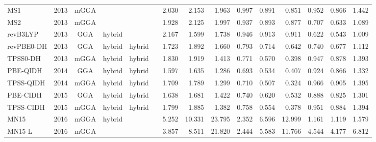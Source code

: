 \begin{landscape}
\begin{longtable}{ll:cccc:rrr:rrr:rrr}
    MS1              & 2013 & mGGA &          &             &           & 2.030             & 2.153             & 1.963  & 0.997              & 0.891             & 0.851  & 0.952   & 0.866 & 1.442 \\
    MS2              & 2013 & mGGA &          &             &           & 1.928             & 2.125             & 1.997  & 0.937              & 0.893             & 0.877  & 0.707   & 0.633 & 1.089 \\
    revB3LYP         & 2013 & GGA  & hybrid   &             &           & 2.167             & 1.599             & 1.738  & 0.946              & 0.913             & 0.911  & 0.622   & 0.543 & 1.009 \\
    revPBE0-DH       & 2013 & GGA  & hybrid   & hybrid      &           & 1.723             & 1.892             & 1.660  & 0.793              & 0.714             & 0.642  & 0.740   & 0.677 & 1.112 \\
    TPSS0-DH         & 2013 & mGGA & hybrid   & hybrid      &           & 1.830             & 1.919             & 1.413  & 0.771              & 0.570             & 0.398  & 0.947   & 0.878 & 1.393 \\
    PBE-QIDH         & 2014 & GGA  & hybrid   & hybrid      &           & 1.597             & 1.635             & 1.286  & 0.693              & 0.534             & 0.407  & 0.924   & 0.866 & 1.332 \\
    TPSS-QIDH        & 2014 & mGGA & hybrid   & hybrid      &           & 1.709             & 1.789             & 1.299  & 0.710              & 0.507             & 0.324  & 0.966   & 0.905 & 1.395 \\
    PBE-CIDH         & 2015 & GGA  & hybrid   & hybrid      &           & 1.638             & 1.681             & 1.422  & 0.740              & 0.620             & 0.532  & 0.888   & 0.825 & 1.301 \\
    TPSS-CIDH        & 2015 & mGGA & hybrid   & hybrid      &           & 1.799             & 1.885             & 1.382  & 0.758              & 0.554             & 0.378  & 0.951   & 0.884 & 1.394 \\
    MN15             & 2016 & mGGA & hybrid   &             &           & 5.252             & 10.331            & 23.795 & 2.352              & 6.596             & 12.999 & 1.161   & 1.119 & 1.579 \\
    MN15-L           & 2016 & mGGA &          &             &           & 3.857             & 8.511             & 21.820 & 2.444              & 5.583             & 11.766 & 4.544   & 4.177 & 6.812 \\

\end{longtable}
\end{landscape}
